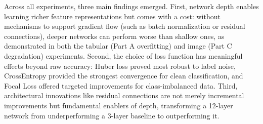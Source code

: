 \documentclass[11pt,a4paper]{article}
\begin{document}
Across all experiments, three main findings emerged. First, network depth enables learning richer feature representations but comes with a cost: without mechanisms to support gradient flow (such as batch normalization or residual connections), deeper networks can perform worse than shallow ones, as demonstrated in both the tabular (Part A overfitting) and image (Part C degradation) experiments. Second, the choice of loss function has meaningful effects beyond raw accuracy: Huber loss proved most robust to label noise, CrossEntropy provided the strongest convergence for clean classification, and Focal Loss offered targeted improvements for class-imbalanced data. Third, architectural innovations like residual connections are not merely incremental improvements but fundamental enablers of depth, transforming a 12-layer network from underperforming a 3-layer baseline to outperforming it.
\end{document}
